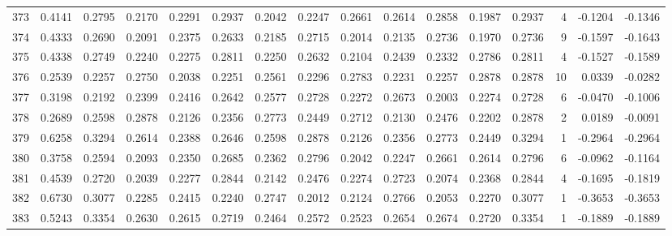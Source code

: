 \begin{tabular}{lrrrrrrrrrrrrrrr}
373 &      0.4141 &  0.2795 &  0.2170 &  0.2291 &  0.2937 &  0.2042 &  0.2247 &  0.2661 &  0.2614 &  0.2858 &   0.1987 &     0.2937 &      4 &                   -0.1204 &                    -0.1346 \\
374 &      0.4333 &  0.2690 &  0.2091 &  0.2375 &  0.2633 &  0.2185 &  0.2715 &  0.2014 &  0.2135 &  0.2736 &   0.1970 &     0.2736 &      9 &                   -0.1597 &                    -0.1643 \\
375 &      0.4338 &  0.2749 &  0.2240 &  0.2275 &  0.2811 &  0.2250 &  0.2632 &  0.2104 &  0.2439 &  0.2332 &   0.2786 &     0.2811 &      4 &                   -0.1527 &                    -0.1589 \\
376 &      0.2539 &  0.2257 &  0.2750 &  0.2038 &  0.2251 &  0.2561 &  0.2296 &  0.2783 &  0.2231 &  0.2257 &   0.2878 &     0.2878 &     10 &                    0.0339 &                    -0.0282 \\
377 &      0.3198 &  0.2192 &  0.2399 &  0.2416 &  0.2642 &  0.2577 &  0.2728 &  0.2272 &  0.2673 &  0.2003 &   0.2274 &     0.2728 &      6 &                   -0.0470 &                    -0.1006 \\
378 &      0.2689 &  0.2598 &  0.2878 &  0.2126 &  0.2356 &  0.2773 &  0.2449 &  0.2712 &  0.2130 &  0.2476 &   0.2202 &     0.2878 &      2 &                    0.0189 &                    -0.0091 \\
379 &      0.6258 &  0.3294 &  0.2614 &  0.2388 &  0.2646 &  0.2598 &  0.2878 &  0.2126 &  0.2356 &  0.2773 &   0.2449 &     0.3294 &      1 &                   -0.2964 &                    -0.2964 \\
380 &      0.3758 &  0.2594 &  0.2093 &  0.2350 &  0.2685 &  0.2362 &  0.2796 &  0.2042 &  0.2247 &  0.2661 &   0.2614 &     0.2796 &      6 &                   -0.0962 &                    -0.1164 \\
381 &      0.4539 &  0.2720 &  0.2039 &  0.2277 &  0.2844 &  0.2142 &  0.2476 &  0.2274 &  0.2723 &  0.2074 &   0.2368 &     0.2844 &      4 &                   -0.1695 &                    -0.1819 \\
382 &      0.6730 &  0.3077 &  0.2285 &  0.2415 &  0.2240 &  0.2747 &  0.2012 &  0.2124 &  0.2766 &  0.2053 &   0.2270 &     0.3077 &      1 &                   -0.3653 &                    -0.3653 \\
383 &      0.5243 &  0.3354 &  0.2630 &  0.2615 &  0.2719 &  0.2464 &  0.2572 &  0.2523 &  0.2654 &  0.2674 &   0.2720 &     0.3354 &      1 &                   -0.1889 &                    -0.1889 \\

\end{tabular}
